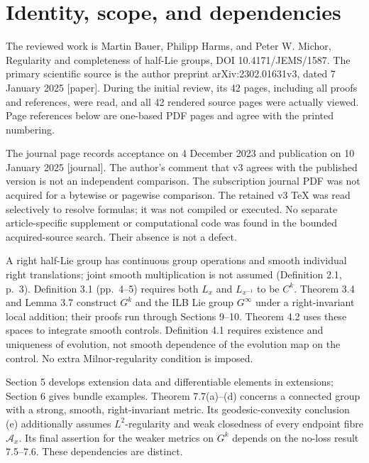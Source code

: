 \documentclass[10pt]{article}
\begin{document}
\section*{Identity, scope, and dependencies}
The reviewed work is Martin Bauer, Philipp Harms, and Peter W. Michor, Regularity and completeness of half-Lie groups, DOI 10.4171/JEMS/1587. The primary scientific source is the author preprint arXiv:2302.01631v3, dated 7 January 2025 [paper]. During the initial review, its 42 pages, including all proofs and references, were read, and all 42 rendered source pages were actually viewed. Page references below are one-based PDF pages and agree with the printed numbering.\par
The journal page records acceptance on 4 December 2023 and publication on 10 January 2025 [journal]. The author’s comment that v3 agrees with the published version is not an independent comparison. The subscription journal PDF was not acquired for a bytewise or pagewise comparison. The retained v3 TeX was read selectively to resolve formulas; it was not compiled or executed. No separate article-specific supplement or computational code was found in the bounded acquired-source search. Their absence is not a defect.\par
A right half-Lie group has continuous group operations and smooth individual right translations; joint smooth multiplication is not assumed (Definition 2.1, p. 3). Definition 3.1 (pp. 4–5) requires both \(L_x\) and \(L_{x^{-1}}\) to be \(C^k\). Theorem 3.4 and Lemma 3.7 construct \(G^k\) and the ILB Lie group \(G^\infty\) under a right-invariant local addition; their proofs run through Sections 9–10. Theorem 4.2 uses these spaces to integrate smooth controls. Definition 4.1 requires existence and uniqueness of evolution, not smooth dependence of the evolution map on the control. No extra Milnor-regularity condition is imposed.\par
Section 5 develops extension data and differentiable elements in extensions; Section 6 gives bundle examples. Theorem 7.7(a)–(d) concerns a connected group with a strong, smooth, right-invariant metric. Its geodesic-convexity conclusion (e) additionally assumes \(L^2\)-regularity and weak closedness of every endpoint fibre \(\mathcal A_x\). Its final assertion for the weaker metrics on \(G^k\) depends on the no-loss result 7.5–7.6. These dependencies are distinct.\par
\end{document}
